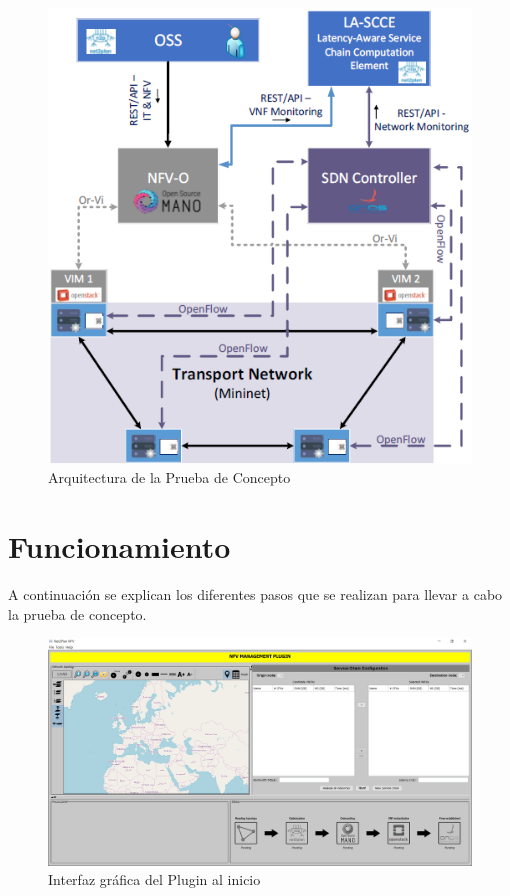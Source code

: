 \begin{figure}[!ht]
	\centering
	\includegraphics[width=0.7\linewidth]{imagenes/esquema_demo}
	\caption{Arquitectura de la Prueba de Concepto}
	\label{fig:esquemademo}
\end{figure}

\clearpage

\section{Funcionamiento}

A continuación se explican los diferentes pasos que se realizan para llevar a cabo la prueba de concepto.

\begin{figure}[!ht]
	\centering
	\includegraphics[width=0.7\linewidth]{imagenes/nfvplugin_dashboard}
	\caption{Interfaz gráfica del Plugin al inicio}
	\label{fig:nfvproof_inicio}
\end{figure}

